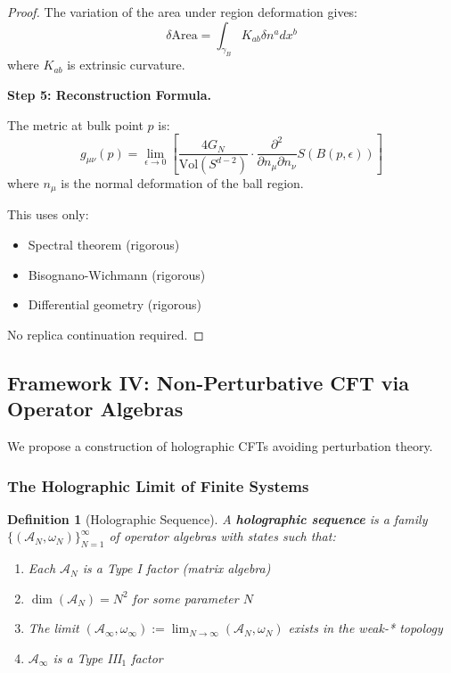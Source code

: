 \documentclass[12pt,a4paper]{article}
\newtheorem{definition}[theorem]{Definition}
\begin{document}
\begin{proof}
The variation of the area under region deformation gives:
\begin{equation}
\delta \text{Area} = \int_{\gamma_B} K_{ab} \delta n^a dx^b
\end{equation}
where $K_{ab}$ is extrinsic curvature.

\textbf{Step 5: Reconstruction Formula.}

The metric at bulk point $p$ is:
\begin{equation}
g_{\mu\nu}(p) = \lim_{\epsilon \to 0} \left[ \frac{4G_N}{\text{Vol}(S^{d-2})} \cdot \frac{\partial^2}{\partial n_\mu \partial n_\nu} S(B(p, \epsilon)) \right]
\end{equation}
where $n_\mu$ is the normal deformation of the ball region.

This uses only:
\begin{itemize}
    \item Spectral theorem (rigorous)
    \item Bisognano-Wichmann (rigorous)
    \item Differential geometry (rigorous)
\end{itemize}
No replica continuation required.
\end{proof}

\subsection{Framework IV: Non-Perturbative CFT via Operator Algebras}

We propose a construction of holographic CFTs avoiding perturbation theory.

\subsubsection{The Holographic Limit of Finite Systems}

\begin{definition}[Holographic Sequence]\label{def:holo-sequence}
A \textbf{holographic sequence} is a family $\{(\mathcal{A}_N, \omega_N)\}_{N=1}^\infty$ of operator algebras with states such that:
\begin{enumerate}
    \item Each $\mathcal{A}_N$ is a Type I factor (matrix algebra)
    \item $\dim(\mathcal{A}_N) = N^2$ for some parameter $N$
    \item The limit $(\mathcal{A}_\infty, \omega_\infty) := \lim_{N\to\infty}(\mathcal{A}_N, \omega_N)$ exists in the weak-* topology
    \item $\mathcal{A}_\infty$ is a Type III$_1$ factor
\end{enumerate}
\end{definition}
\end{document}
